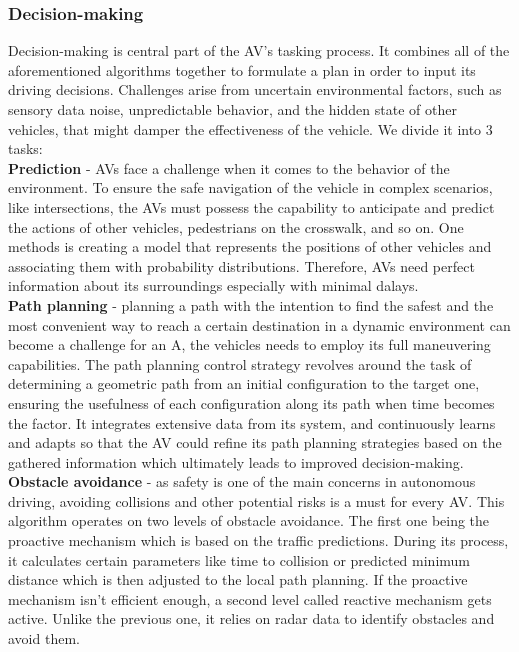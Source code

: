 \documentclass[10pt,oneside,english,a4paper]{article}
\begin{document}
\subsubsection{Decision-making}
\indent Decision-making is central part of the AV's tasking process. It combines all of the aforementioned algorithms together to formulate a plan in order to input its driving decisions. Challenges arise from uncertain environmental factors, such as sensory data noise, unpredictable behavior, and the hidden state of other vehicles, that might damper the effectiveness of the vehicle. We divide it into 3 tasks:\\
\indent \textbf{Prediction} - AVs face a challenge when it comes to the behavior of the environment. To ensure the safe navigation of the vehicle in complex scenarios, like intersections, the AVs must possess the capability to anticipate and predict the actions of other vehicles, pedestrians on the crosswalk, and so on. One methods is creating a model that represents the positions of other vehicles and associating them with probability distributions. Therefore, AVs need perfect information about its surroundings especially with minimal dalays.\\
\indent \textbf{Path planning} - planning a path with the intention to find the safest and the most convenient way to reach a certain destination in a dynamic environment can become a challenge for an A, the vehicles needs to employ its full maneuvering capabilities. The path planning control strategy revolves around the task of determining a geometric path from an initial configuration to the target one, ensuring the usefulness of each configuration along its path when time becomes the factor. It integrates extensive data from its system, and continuously learns and adapts so that the AV could refine its path planning strategies based on the gathered information which ultimately leads to improved decision-making.\\
\indent \textbf{Obstacle avoidance} - as safety is one of the main concerns in autonomous driving, avoiding collisions and other potential risks is a must for every AV. This algorithm operates on two levels of obstacle avoidance. The first one being the proactive mechanism which is based on the traffic predictions. During its process, it calculates certain parameters like time to collision or predicted minimum distance which is then adjusted to the local path planning. If the proactive mechanism isn't efficient enough, a second level called reactive mechanism gets active. Unlike the previous one, it relies on radar data to identify obstacles and avoid them. 
\cite{computerarch}\cite{AIandIoT}\cite{approach}
\end{document}
